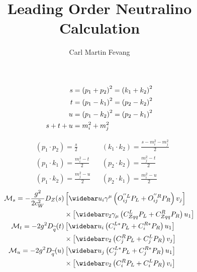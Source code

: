 \documentclass[english,notitlepage]{article}
\title{Leading Order Neutralino Calculation}
\author{Carl Martin Fevang}
\begin{document}
    \maketitle


    \begin{figure} [ht!]
        \centering
    \end{figure}

    \begin{subequations}
        \begin{align}
            s &= \left(p_1 + p_2\right)^2 = \left(k_1 + k_2\right)^2 \\
            t &= \left(p_1-k_1\right)^2 = \left(p_2-k_2\right)^2 \\
            u &= \left(p_1-k_2\right)^2 = \left(p_2-k_1\right)^2 \\
            s + t + u &= m_i^2 + m_j^2
        \end{align}
    \end{subequations}

    \begin{subequations}
        \begin{align}
            &(p_1 \cdot p_2) = \frac{s}{2} & &(k_1 \cdot k_2) = \frac{s-m_i^2-m_j^2}{2} \\
            &(p_1 \cdot k_1) = \frac{m_i^2 - t}{2} & &(p_2 \cdot k_2) = \frac{m_j^2-t}{2} \\
            &(p_1 \cdot k_2) = \frac{m_j^2 - u}{2} & &(p_2 \cdot k_1) = \frac{m_i^2-u}{2}
        \end{align}
    \end{subequations}
    \begin{subequations}
        \begin{align} \nonumber
            \M_s = -\frac{g^2}{2c_W^2} D_Z(s) &\bclosed{ \wbar{u}_i\gamma^\mu\pclosed{O^{''L}_{ij}P_L + O^{''R}_{ij}P_R} v_j } \\
            &\times \bclosed{ \wbar{v}_2 \gamma_\mu \pclosed{C^L_{Zqq}P_L + C^R_{Zqq}P_R} u_1 } \\ \nonumber
            \M_t = -2g^2 D_{\wtilde{q}}(t) &\bclosed{ \wbar{u}_i \pclosed{C_{i}^{L*}P_L + C_{i}^{R*} P_R} u_1 } \\
            &\times \bclosed{ \wbar{v}_2 \pclosed{C^R_{j}P_L + C^L_{j}P_R} v_j } \\ \nonumber
            \M_u = -2g^2 D_{\wtilde{q}}(u) &\bclosed{ \wbar{u}_j \pclosed{C_{j}^{L*}P_L + C_{j}^{R*} P_R} u_1 } \\
            &\times \bclosed{ \wbar{v}_2 \pclosed{C^R_{i}P_L + C^L_{i}P_R} v_i }
        \end{align}
    \end{subequations}
\end{document}
